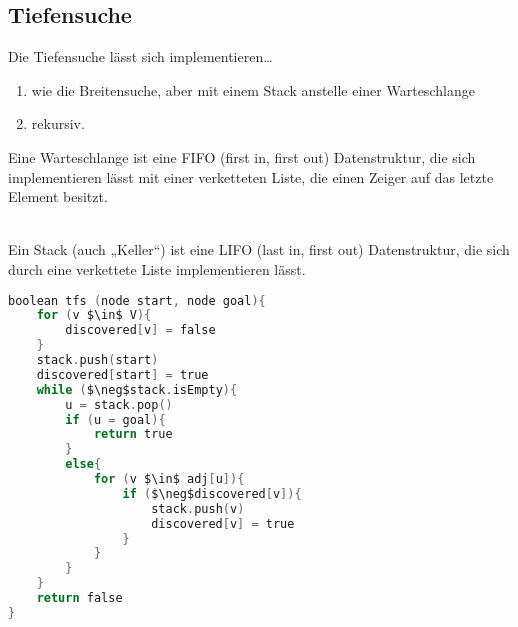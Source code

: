 \documentclass{scrreprt}
\begin{document}
\subsection{Tiefensuche}
Die Tiefensuche lässt sich implementieren…
\begin{enumerate}
\item wie die Breitensuche, aber mit einem Stack anstelle einer Warteschlange
\item rekursiv.
\end{enumerate}
Eine Warteschlange ist eine FIFO (first in, first out) Datenstruktur, die sich implementieren lässt mit einer verketteten Liste, die einen Zeiger auf das letzte Element besitzt.\\
\\
Ein Stack (auch „Keller“) ist eine LIFO (last in, first out) Datenstruktur, die sich durch eine verkettete Liste implementieren lässt.\\
\begin{lstlisting}[language=C]
boolean tfs (node start, node goal){
	for (v $\in$ V){
		discovered[v] = false
	}
	stack.push(start)
	discovered[start] = true
	while ($\neg$stack.isEmpty){
		u = stack.pop()
		if (u = goal){
			return true
		}
		else{
			for (v $\in$ adj[u]){
				if ($\neg$discovered[v]){
					stack.push(v)
					discovered[v] = true
				}
			}
		}
	}
	return false
}
\end{lstlisting}
\end{document}

